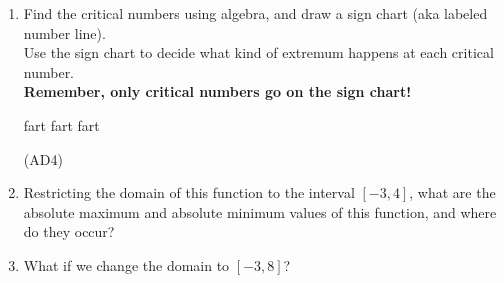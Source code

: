 	\begin{enumerate}[leftmargin=15pt]

		\item Find the critical numbers using algebra, and draw a sign chart (aka labeled number line). \\
		Use the sign chart to decide what kind of extremum happens at each critical number.\\
		\textbf{Remember, only critical numbers go on the sign chart!}

		\vfill
		fart fart fart
		\vfill
	
		\hrulefill (AD4)
		\item Restricting the domain of this function to the interval $[-3, 4]$, what are the absolute maximum and absolute minimum values of this function, and where do they occur?

		\vspace{10em}
	
		
		\item What if we change the domain to $[-3,8]$?
		
		\vspace{5em}
	
	\end{enumerate}
\pagebreak


